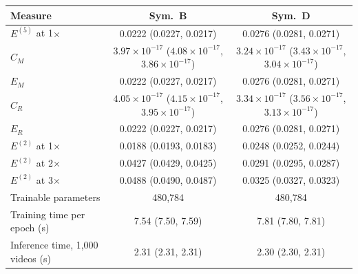 \begin{tabular}{lcc}
\toprule
Measure & Sym.\ B & Sym.\ D \\
\midrule
$E^{(5)}$ at 1$\times$ & 0.0222 (0.0227, 0.0217) & 0.0276 (0.0281, 0.0271) \\
$C_M$ & $3.97\times10^{-17}$ ($4.08\times10^{-17}$, $3.86\times10^{-17}$) & $3.24\times10^{-17}$ ($3.43\times10^{-17}$, $3.04\times10^{-17}$) \\
$E_M$ & 0.0222 (0.0227, 0.0217) & 0.0276 (0.0281, 0.0271) \\
$C_R$ & $4.05\times10^{-17}$ ($4.15\times10^{-17}$, $3.95\times10^{-17}$) & $3.34\times10^{-17}$ ($3.56\times10^{-17}$, $3.13\times10^{-17}$) \\
$E_R$ & 0.0222 (0.0227, 0.0217) & 0.0276 (0.0281, 0.0271) \\
$E^{(2)}$ at 1$\times$ & 0.0188 (0.0193, 0.0183) & 0.0248 (0.0252, 0.0244) \\
$E^{(2)}$ at 2$\times$ & 0.0427 (0.0429, 0.0425) & 0.0291 (0.0295, 0.0287) \\
$E^{(2)}$ at 3$\times$ & 0.0488 (0.0490, 0.0487) & 0.0325 (0.0327, 0.0323) \\
Trainable parameters & 480,784 & 480,784 \\
Training time per epoch (s) & 7.54 (7.50, 7.59) & 7.81 (7.80, 7.81) \\
Inference time, 1,000 videos (s) & 2.31 (2.31, 2.31) & 2.30 (2.30, 2.31) \\
\bottomrule
\end{tabular}

